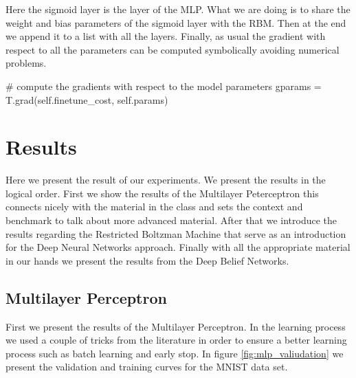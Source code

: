 \documentclass[11pt,a4paper]{article}
\begin{document}
Here the sigmoid layer is the layer of the MLP. What we are doing is to share the weight and bias parameters of the sigmoid layer with the RBM. Then at the end we append it to a list with all the layers. Finally, as usual the gradient with respect to all the parameters can be computed symbolically avoiding numerical problems.

\begin{python}
# compute the gradients with respect to the model parameters
        gparams = T.grad(self.finetune_cost, self.params)

\end{python}


\section{Results}

Here we present the result of our experiments. We present the results in the logical order. First we show the results of the Multilayer Peterceptron this connects nicely with the material in the class and sets the context and benchmark to talk about more advanced material. After that we introduce the results regarding the Restricted Boltzman Machine that serve as an introduction for the Deep Neural Networks approach. Finally with all the appropriate material in our hands we present the results from the Deep Belief Networks. 

\subsection{Multilayer Perceptron}

First we present the results of the Multilayer Perceptron. In the learning process we used a couple of tricks from the literature in order to ensure a better learning  process \citep{lecun2012efficient} such as batch learning and early stop. In figure \ref{fig:mlp_valiudation} we present the validation and training curves for the MNIST data set. 
\end{document}
